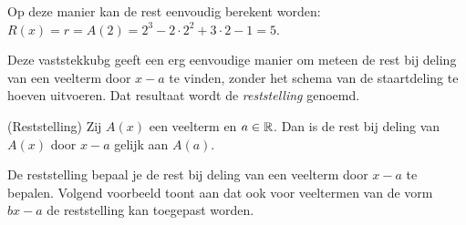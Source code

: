 \documentclass{ximera}
\begin{document}
Op deze manier kan de rest eenvoudig berekent worden: $R(x) = r = A(2) = 2^3 - 2 \cdot 2^2 + 3 \cdot 2 - 1 = 5$.



Deze vaststekkubg geeft een erg eenvoudige manier om meteen de rest bij deling van een veelterm door $x-a$ te vinden, zonder het schema van de staartdeling te hoeven uitvoeren. Dat resultaat wordt de \textit{ reststelling} genoemd.

\begin{theorem} (Reststelling)
Zij $A(x)$ een veelterm en $a \in \mathbb{R}$. Dan is de rest bij deling van $A(x)$ door $x-a$ gelijk aan $A(a)$.
\end{theorem} 






De reststelling bepaal je de rest bij deling van een veelterm door $x-a$ te bepalen. Volgend voorbeeld toont aan dat ook voor veeltermen van de vorm $bx-a$ de reststelling kan toegepast worden. 
\end{document}
